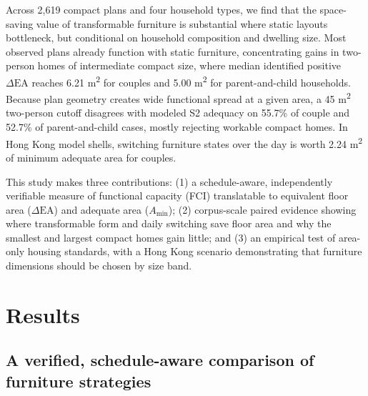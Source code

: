 \documentclass[12pt,letterpaper]{article}
\begin{document}
Across 2,619 compact plans and four household types, we find that the space-saving value of transformable furniture is substantial where static layouts bottleneck, but conditional on household composition and dwelling size. Most observed plans already function with static furniture, concentrating gains in two-person homes of intermediate compact size, where median identified positive \(\Delta\text{EA}\) reaches 6.21 m\textsuperscript{2} for couples and 5.00 m\textsuperscript{2} for parent-and-child households. Because plan geometry creates wide functional spread at a given area, a 45 m\textsuperscript{2} two-person cutoff disagrees with modeled S2 adequacy on 55.7\% of couple and 52.7\% of parent-and-child cases, mostly rejecting workable compact homes. In Hong Kong model shells, switching furniture states over the day is worth 2.24 m\textsuperscript{2} of minimum adequate area for couples.

This study makes three contributions: (1) a schedule-aware, independently verifiable measure of functional capacity (FCI) translatable to equivalent floor area (\(\Delta\text{EA}\)) and adequate area (\(A_{\min}\)); (2) corpus-scale paired evidence showing where transformable form and daily switching save floor area and why the smallest and largest compact homes gain little; and (3) an empirical test of area-only housing standards, with a Hong Kong scenario demonstrating that furniture dimensions should be chosen by size band.

\section{Results}\label{results}

\subsection{A verified, schedule-aware comparison of furniture strategies}\label{a-verified-schedule-aware-comparison-of-furniture-strategies}
\end{document}
